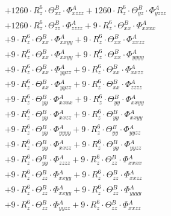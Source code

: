 \documentclass{article}
\begin{document}
\begin{subequations}
\begin{gather}
\begin{array}{c}
 \\[0.2em] 		 + 1260 \cdot R_{z}^{6} \cdot \Theta{}^{B}_{xz} \cdot \Phi{}^{A}_{xzzz}+ 1260 \cdot R_{z}^{6} \cdot \Theta{}^{B}_{yz} \cdot \Phi{}^{A}_{yzzz} 
 \\[0.2em] 		 + 1260 \cdot R_{z}^{6} \cdot \Theta{}^{B}_{zz} \cdot \Phi{}^{A}_{zzzz}+ 9 \cdot R_{z}^{6} \cdot \Theta{}^{B}_{xx} \cdot \Phi{}^{A}_{xxxx} 
 \\[0.2em] 		 + 9 \cdot R_{z}^{6} \cdot \Theta{}^{B}_{xx} \cdot \Phi{}^{A}_{xxyy}+ 9 \cdot R_{z}^{6} \cdot \Theta{}^{B}_{xx} \cdot \Phi{}^{A}_{xxzz} 
 \\[0.2em] 		 + 9 \cdot R_{z}^{6} \cdot \Theta{}^{B}_{xx} \cdot \Phi{}^{A}_{xxyy}+ 9 \cdot R_{z}^{6} \cdot \Theta{}^{B}_{xx} \cdot \Phi{}^{A}_{yyyy} 
 \\[0.2em] 		 + 9 \cdot R_{z}^{6} \cdot \Theta{}^{B}_{xx} \cdot \Phi{}^{A}_{yyzz}+ 9 \cdot R_{z}^{6} \cdot \Theta{}^{B}_{xx} \cdot \Phi{}^{A}_{xxzz} 
 \\[0.2em] 		 + 9 \cdot R_{z}^{6} \cdot \Theta{}^{B}_{xx} \cdot \Phi{}^{A}_{yyzz}+ 9 \cdot R_{z}^{6} \cdot \Theta{}^{B}_{xx} \cdot \Phi{}^{A}_{zzzz} 
 \\[0.2em] 		 + 9 \cdot R_{z}^{6} \cdot \Theta{}^{B}_{yy} \cdot \Phi{}^{A}_{xxxx}+ 9 \cdot R_{z}^{6} \cdot \Theta{}^{B}_{yy} \cdot \Phi{}^{A}_{xxyy} 
 \\[0.2em] 		 + 9 \cdot R_{z}^{6} \cdot \Theta{}^{B}_{yy} \cdot \Phi{}^{A}_{xxzz}+ 9 \cdot R_{z}^{6} \cdot \Theta{}^{B}_{yy} \cdot \Phi{}^{A}_{xxyy} 
 \\[0.2em] 		 + 9 \cdot R_{z}^{6} \cdot \Theta{}^{B}_{yy} \cdot \Phi{}^{A}_{yyyy}+ 9 \cdot R_{z}^{6} \cdot \Theta{}^{B}_{yy} \cdot \Phi{}^{A}_{yyzz} 
 \\[0.2em] 		 + 9 \cdot R_{z}^{6} \cdot \Theta{}^{B}_{yy} \cdot \Phi{}^{A}_{xxzz}+ 9 \cdot R_{z}^{6} \cdot \Theta{}^{B}_{yy} \cdot \Phi{}^{A}_{yyzz} 
 \\[0.2em] 		 + 9 \cdot R_{z}^{6} \cdot \Theta{}^{B}_{yy} \cdot \Phi{}^{A}_{zzzz}+ 9 \cdot R_{z}^{6} \cdot \Theta{}^{B}_{zz} \cdot \Phi{}^{A}_{xxxx} 
 \\[0.2em] 		 + 9 \cdot R_{z}^{6} \cdot \Theta{}^{B}_{zz} \cdot \Phi{}^{A}_{xxyy}+ 9 \cdot R_{z}^{6} \cdot \Theta{}^{B}_{zz} \cdot \Phi{}^{A}_{xxzz} 
 \\[0.2em] 		 + 9 \cdot R_{z}^{6} \cdot \Theta{}^{B}_{zz} \cdot \Phi{}^{A}_{xxyy}+ 9 \cdot R_{z}^{6} \cdot \Theta{}^{B}_{zz} \cdot \Phi{}^{A}_{yyyy} 
 \\[0.2em] 		 + 9 \cdot R_{z}^{6} \cdot \Theta{}^{B}_{zz} \cdot \Phi{}^{A}_{yyzz}+ 9 \cdot R_{z}^{6} \cdot \Theta{}^{B}_{zz} \cdot \Phi{}^{A}_{xxzz} 

\end{array}
\end{gather}
\end{subequations}
\end{document}
